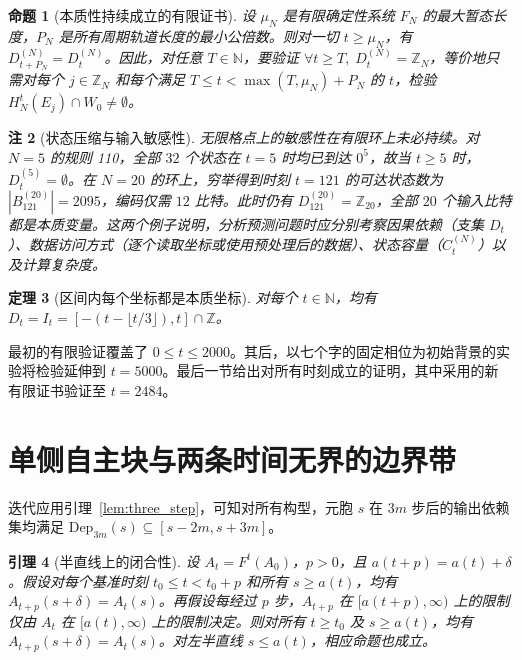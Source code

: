 \documentclass[11pt, a4paper]{article}
\newtheorem{theorem}{定理}[section]
\newtheorem{lemma}[theorem]{引理}
\newtheorem{proposition}[theorem]{命题}
\newtheorem{remark}[theorem]{注}
\begin{document}
\begin{proposition}[本质性持续成立的有限证书]\label{prop:ring_cert}
设 $\mu_N$ 是有限确定性系统 $F_N$ 的最大暂态长度，$P_N$ 是所有周期轨道长度的最小公倍数。则对一切 $t \ge \mu_N$，有 $D_{t+P_N}^{(N)} = D_t^{(N)}$。因此，对任意 $T \in \mathbb{N}$，要验证 $\forall t \ge T,\; D_t^{(N)} = \mathbb{Z}_N$，等价地只需对每个 $j \in \mathbb{Z}_N$ 和每个满足 $T \le t < \max(T, \mu_N) + P_N$ 的 $t$，检验 $H_N^t(E_j) \cap W_0 \ne \emptyset$。
\end{proposition}

\begin{remark}[状态压缩与输入敏感性]
无限格点上的敏感性在有限环上未必持续。对 $N = 5$ 的规则 110，全部 $32$ 个状态在 $t = 5$ 时均已到达 $0^5$，故当 $t \ge 5$ 时，$D_t^{(5)} = \emptyset$。在 $N = 20$ 的环上，穷举得到时刻 $t = 121$ 的可达状态数为 $|B_{121}^{(20)}| = 2095$，编码仅需 $12$ 比特。此时仍有 $D_{121}^{(20)} = \mathbb{Z}_{20}$，全部 $20$ 个输入比特都是本质变量。这两个例子说明，分析预测问题时应分别考察因果依赖（支集 $D_t$）、数据访问方式（逐个读取坐标或使用预处理后的数据）、状态容量（$C_t^{(N)}$）以及计算复杂度。
\end{remark}

\begin{theorem}[区间内每个坐标都是本质坐标]\label{conj:gap_free}
对每个 $t \in \mathbb{N}$，均有 $D_t = I_t = [-(t - \lfloor t/3 \rfloor), t] \cap \mathbb{Z}$。
\end{theorem}

最初的有限验证覆盖了 $0\le t\le2000$。其后，以七个字的固定相位为初始背景的实验将检验延伸到 $t=5000$。最后一节给出对所有时刻成立的证明，其中采用的新有限证书验证至 $t=2484$。

\section{单侧自主块与两条时间无界的边界带}

迭代应用引理~\ref{lem:three_step}，可知对所有构型，元胞 $s$ 在 $3m$ 步后的输出依赖集均满足 $\mathrm{Dep}_{3m}(s) \subseteq [s - 2m, s + 3m]$。

\begin{lemma}[半直线上的闭合性]\label{lem:one_sided}
设 $A_t = F^t(A_0)$，$p > 0$，且 $a(t + p) = a(t) + \delta$。假设对每个基准时刻 $t_0 \le t < t_0 + p$ 和所有 $s \ge a(t)$，均有 $A_{t+p}(s + \delta) = A_t(s)$。再假设每经过 $p$ 步，$A_{t+p}$ 在 $[a(t+p), \infty)$ 上的限制仅由 $A_t$ 在 $[a(t), \infty)$ 上的限制决定。则对所有 $t \ge t_0$ 及 $s \ge a(t)$，均有 $A_{t+p}(s + \delta) = A_t(s)$。对左半直线 $s \le a(t)$，相应命题也成立。
\end{lemma}
\end{document}
